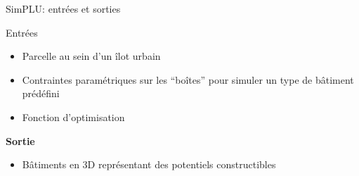 \documentclass[xcolor=table]{beamer}
\begin{document}
\begin{frame}{SimPLU: entrées et sorties}
	\begin{block}{Entrées}

		\begin{itemize}
			\small
			\item Parcelle au sein d'un îlot urbain
			\item Contraintes paramétriques sur les ``boîtes'' pour simuler un type de bâtiment prédéfini
			\item Fonction d'optimisation
		\end{itemize}
		\textbf{Sortie}
		\begin{itemize}
			\small
			\item Bâtiments en 3D représentant des potentiels constructibles
		\end{itemize}
	\end{block}
	\begin{block}
	\end{block}		
\end{frame}
\end{document}
